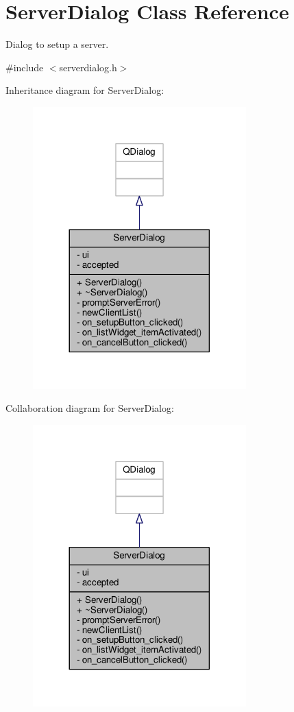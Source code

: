 \hypertarget{classServerDialog}{}\section{Server\+Dialog Class Reference}
\label{classServerDialog}


Dialog to setup a server.  




{\ttfamily \#include $<$serverdialog.\+h$>$}



Inheritance diagram for Server\+Dialog\+:
\nopagebreak
\begin{figure}[H]
\begin{center}
\leavevmode
\includegraphics[width=233pt]{classServerDialog__inherit__graph}
\end{center}
\end{figure}


Collaboration diagram for Server\+Dialog\+:
\nopagebreak
\begin{figure}[H]
\begin{center}
\leavevmode
\includegraphics[width=233pt]{classServerDialog__coll__graph}
\end{center}
\end{figure}
